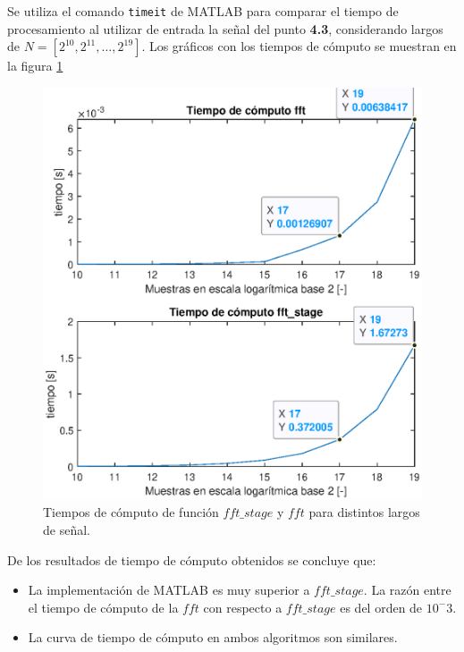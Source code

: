 \begin{enumerate}
Se utiliza el comando \texttt{timeit} de MATLAB para comparar el tiempo de procesamiento al utilizar de entrada la señal del punto \textbf{4.3}, considerando largos de $N = [2^{10}, 2^{11}, \dots , 2^{19}]$. Los gráficos con los tiempos de cómputo se muestran en la figura \ref{p6_3cmp}
\begin{figure}[H]
    \centering
    \includegraphics[width = .98 \linewidth]{Figuras/p6_3_cmp.eps}
    \caption{Tiempos de cómputo de función $fft\_stage$ y $fft$ para distintos largos de señal.}
    \label{p6_3cmp}
\end{figure}

De los resultados de tiempo de cómputo obtenidos se concluye que:
\begin{itemize}
    \item La implementación de MATLAB es muy superior a $fft\_stage$. La razón entre el tiempo de cómputo de la $fft$ con respecto a $fft\_stage$ es del orden de $10^-3$. 
    \item La curva de tiempo de cómputo en ambos algoritmos son similares.
\end{itemize}
\end{enumerate}